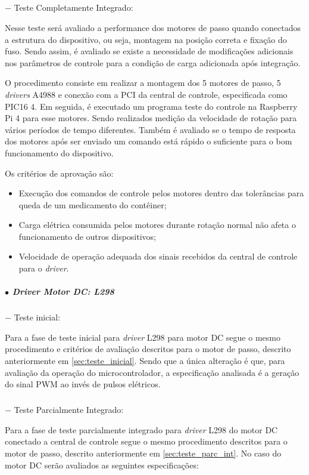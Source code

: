 \subparagraph*{} $-$ Teste Completamente Integrado:\label{sec:teste_comp_int}

Nesse teste será avaliado a performance dos motores de passo quando conectados a estrutura do dispositivo, ou seja, montagem na posição correta e fixação do fuso. Sendo assim, é avaliado se existe a necessidade de modificações adicionais nos parâmetros de controle para a condição de carga adicionada após integração.

O procedimento consiste em realizar a montagem dos 5 motores de passo, 5 \textit{drivers} A4988 e conexão com a PCI da central de controle, especificada como PIC16 4. Em seguida, é executado um programa teste do controle na Raspberry Pi 4 para esse motores. Sendo realizados medição da velocidade de rotação para vários períodos de tempo diferentes. Também é avaliado se o tempo de resposta dos motores após ser enviado um comando está rápido o suficiente para o bom funcionamento do dispositivo. 

Os critérios de aprovação são:

\begin{itemize}
    \item Execução dos comandos de controle pelos motores dentro das tolerâncias para queda de um medicamento do contêiner;
    \item Carga elétrica consumida pelos motores durante rotação normal não afeta o funcionamento de outros dispositivos;
    \item Velocidade de operação adequada dos sinais recebidos da central de controle para o \textit{driver}.
\end{itemize}


\subparagraph*{$\bullet$ \textit{Driver} Motor DC: L298} \hfill

\subparagraph*{} $-$ Teste inicial:

Para a fase de teste inicial para \textit{driver} L298 para motor DC segue o mesmo procedimento e critérios de avaliação descritos para o motor de passo, descrito anteriormente em \ref{sec:teste_inicial}. Sendo que a única alteração é que, para avaliação da operação do microcontrolador, a especificação analisada é a geração do sinal PWM ao invés de pulsos elétricos. 

\subparagraph*{} $-$ Teste Parcialmente Integrado:

Para a fase de teste parcialmente integrado para \textit{driver} L298 do motor DC conectado a central de controle segue o mesmo procedimento descritos para o motor de passo, descrito anteriormente em \ref{sec:teste_parc_int}. No caso do motor DC serão avaliados as seguintes especificações: 


